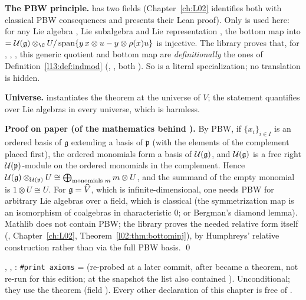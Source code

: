 \begin{dictionary}
\textbf{The PBW principle.}  has two fields (Chapter~\ref{ch:L02} identifies both with classical PBW
consequences and presents their Lean proof). Only  is used here: for any Lie algebra , Lie subalgebra  and Lie
representation , the bottom map into
 $=\lthirteenUE(\mathfrak g)\otimes_\C U/\operatorname{span}\{y\,x\otimes u - y\otimes\rho(x)u\}$
is injective. The library proves that, for , , , this
generic quotient and bottom map are \emph{definitionally} the ones of Definition~\ref{l13:def:indmod}
(, , both ). So  is a
literal specialization; no translation is hidden.

\textbf{Universe.}  instantiates the theorem at the universe of $V$; the statement quantifies over Lie
algebras in every universe, which is harmless.
\end{dictionary}

\textbf{Proof on paper (of the mathematics behind ).} By PBW, if $\{x_i\}_{i\in I}$ is an ordered basis of
$\mathfrak g$ extending a basis of $\mathfrak p$ (with the elements of the complement placed first), the ordered monomials form a
basis of $\mathcal{U}(\mathfrak g)$, and $\mathcal{U}(\mathfrak g)$ is a free right $\mathcal{U}(\mathfrak p)$-module on the
ordered monomials in the complement. Hence $\mathcal{U}(\mathfrak g)\otimes_{\mathcal{U}(\mathfrak p)}U\cong
\bigoplus_{\text{monomials }m}m\otimes U$, and the summand of the empty monomial is $1\otimes U\cong U$. For
$\mathfrak g = \widehat{V}$, which is infinite-dimensional, one needs PBW for arbitrary Lie algebras over a field, which is
classical (the symmetrization map is an isomorphism of coalgebras in characteristic $0$; or Bergman's diamond lemma). Mathlib
does not contain PBW; the library proves the needed relative form itself (,
Chapter~\ref{ch:L02}, Theorem~\ref{l02:thm:bottominj}), by Humphreys' relative construction rather than via the full PBW
basis. \qed

\begin{status}
, , : \texttt{\#print axioms} =
 (re-probed at a later commit, after  became a theorem, not re-run for this edition; at the snapshot the list also contained
). Unconditional; they use the theorem  (field ). Every other declaration of
this chapter is free of .
\end{status}

